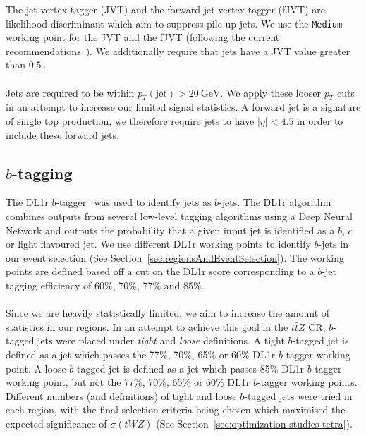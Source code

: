  The jet-vertex-tagger (JVT) and the forward jet-vertex-tagger (fJVT) are likelihood discriminant which aim to suppress pile-up jets. We use the \texttt{Medium} working point for the JVT and the fJVT (following the current recommendations~\cite{JVTandfJVT-Recommendations}). We additionally require that jets have a JVT value greater than $\SI{0.5}{}$.\\\\
 
Jets are required to be within $p_{T}(\text{jet}) > \SI{20}{\GeV}$. We apply these looser $p_T$ cuts in an attempt to increase our limited signal statistics. A forward jet is a signature of single top production, we therefore require jets to have $|\eta| < 4.5$ in order to include these forward jets.



\subsection{$b$-tagging}
The DL1r $b$-tagger~\cite{DL1r-paper} was used to identify jets as $b$-jets. The DL1r algorithm combines outputs from several low-level tagging algorithms using a Deep Neural Network and outputs the probability that a given input jet is identified as a $b$, $c$ or light flavoured jet. We use different DL1r working points to identify $b$-jets in our event selection (See Section~\ref{sec:regionsAndEventSelection}). The working points are defined based off a cut on the DL1r score corresponding to a $b$-jet tagging efficiency of 60$\%$, 70$\%$, 77$\%$ and 85$\%$. \\\\
Since we are heavily statistically limited, we aim to increase the amount of statistics in our regions. In an attempt to achieve this goal in the $t\bar{t}Z$ CR, $b$-tagged jets were placed under \textit{tight} and \textit{loose} definitions. A tight $b$-tagged jet is defined as a jet which passes the 77$\%$, 70$\%$, 65$\%$ or 60$\%$ DL1r $b$-tagger working point. A loose $b$-tagged jet is defined as a jet which passes 85$\%$ DL1r $b$-tagger working point, but not the 77$\%$, 70$\%$, 65$\%$ or 60$\%$ DL1r $b$-tagger working points. Different numbers (and definitions) of tight and loose $b$-tagged jets were tried in each region, with the final selection criteria being chosen which maximised the expected significance of $\sigma(tWZ)$ (See Section~\ref{sec:optimization-studies-tetra}).





